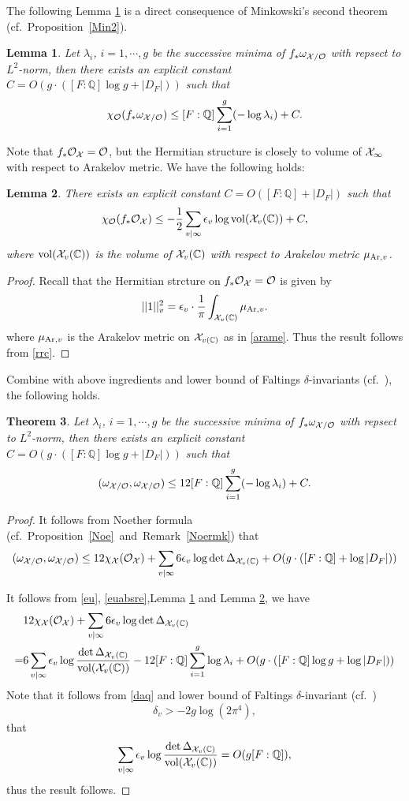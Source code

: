 \documentclass[]{amsart}
\newcommand{\BC}{{\mathbb {C}}} \newcommand{\BD}{{\mathbb {D}}}
\newcommand{\BQ}{{\mathbb {Q}}} \newcommand{\BR}{{\mathbb {R}}}
\newcommand{\CO}{{\mathcal {O}}} \newcommand{\CP}{{\mathcal {P}}}
\theoremstyle{plain}
\newtheorem{thm}{Theorem}[section] \newtheorem{cor}[thm]{Corollary}
\newtheorem{lem}[thm]{Lemma}  \newtheorem{prop}[thm]{Proposition}\newtheorem{def-prop}[thm]{Definition and Proposition}
\theoremstyle{remark} \newtheorem{remark}[thm]{Remark}
\theoremstyle{remark} \newtheorem{exercise}{Exercise}
\theoremstyle{remark} \newtheorem{example}{Example}
\numberwithin{equation}{section}
\begin{document}
The following Lemma \ref{Min} is a direct consequence of Minkowski's second theorem (cf.~Proposition~\ref{Min2}).
\begin{lem}\label{Min}
Let $\lambda_i$, $i=1,\cdots, g$ be the successive minima of $f_*\omega_{\CX/\CO}$ with repsect to $L^2$-norm, then there exists an explicit constant $C=O(g\cdot([F:\BQ]\log g +|D_F|))$ such that 
 \[\chi_{\CO}(f_*\omega_{\CX/\CO})\leq [F:\BQ]\sum_{i=1}^{g}(-\log\lambda_i)+C.\]

\end{lem}
Note that $f_*\CO_{\CX}=\CO$, but the Hermitian structure is closely to volume of ${\mathcal {X}}_\infty$ with respect to Arakelov metric. We have the following holds:
\begin{lem}\label{aravol}
There exists an explicit constant $C=O([F:\BQ]+|D_F|)$ such that 
\[\chi_{\CO}(f_*\CO_{\CX})\leq-\frac{1}{2}\sum_{v|\infty}\epsilon_v\log\vol(\CX_v(\BC))+C,\]where $\vol(\CX_v(\BC))$ is the volume of $\CX_v(\BC)$ with respect to Arakelov metric $\mu_{{\mathrm{Ar}},v}$.
\end{lem}
\begin{proof}Recall that the Hermitian strcture on $f_*\CO_{\CX}=\CO$ is given by
  \[||1||_v^2=\epsilon_v\cdot \frac{1}{\pi }\int_{\CX_v(\BC)}\mu_{\Ar,v}.\]where $\mu_{{\mathrm{Ar}},v}$ is the Arakelov metric on $\CX_{v(\BC)}$ as in \eqref{arame}. Thus the result follows from \eqref{rrc}.

\end{proof}
Combine with above ingredients and lower bound of Faltings $\delta$-invariants (cf.~\cite{Wilms:2017}), the following holds.
\begin{thm}\label{main:2}
Let $\lambda_i$, $i=1,\cdots, g$ be the successive minima of $f_*\omega_{\CX/\CO}$ with repsect to $L^2$-norm, then there exists an explicit constant $C=O(g\cdot([F:\BQ]\log g +|D_F|))$ such that 
\[(\omega_{\CX/\CO},\omega_{\CX/\CO})\leq 12[F:\BQ]\sum_{i=1}^{g}(-\log\lambda_i)+C.\]
\end{thm}
\begin{proof}

It follows from Noether formula (cf.~Proposition~\ref{Noe}~and~Remark~\ref{Noermk}) that
\[(\omega_{\CX/\CO},\omega_{\CX/\CO})\leq 12\chi_{\CX}(\CO_{\CX})+\sum_{v|\infty}6{\epsilon_v}\log \det \Delta_{\CX_v(\BC)}+O(g\cdot ([F:\BQ]+\log|D_F|))\] 

It follows from \eqref{eu}, \eqref{euabsre},Lemma \ref{Min} and Lemma \ref{aravol}, we have 
\[\begin{aligned}
  &12\chi_{\CX}(\CO_{\CX})+\sum_{v|\infty}6{\epsilon_v}\log \det \Delta_{\CX_v(\BC)}\\
  =&6\sum_{v|\infty}\epsilon_v \log \frac{\det \Delta_{\CX_v(\BC)}}{\vol(\CX_v(\BC))} - 12[F:\BQ]\sum_{i=1}^{g}\log\lambda_i+O(g\cdot ([F:\BQ]\log g+\log|D_F|))
\end{aligned}\]
Note that it follows from \eqref{daq} and lower bound of Faltings $\delta$-invariant (cf.~\cite[Cor.~1.2]{Wilms:2017})
\[\delta_v>-2g\log(2\pi^4),\] that 
\[\sum_{v|\infty}\epsilon_v \log \frac{\det \Delta_{\CX_v(\BC)}}{\vol(\CX_v(\BC))}=O(g[F:\BQ]),\]thus the result follows.
\end{proof}
\end{document}
